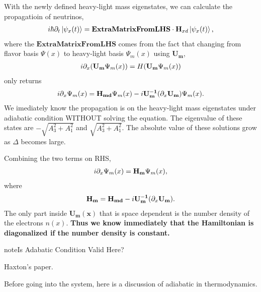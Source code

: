 \documentclass[letterpaper,12pt,english]{sphinxmanual}
\newcommand{\ket}[1]{\left| #1\right\rangle}
\begin{document}
With the newly defined heavy-light mass eigenstates, we can calculate the propagatioin of neutrinos,
\begin{gather}
\begin{split}i \hbar \partial_t \ket{\psi_x(t)} = \mathbf{Extra Matrix From LHS}\cdot \mathbf H_{xd} \ket{\psi_x(t)},\end{split}\notag
\end{gather}
where the \(\mathbf{Extra Matrix From LHS}\) comes from the fact that changing from flavor basis \(\Psi(x)\) to heavy-light basis \(\Psi_m(x)\) using \(\mathbf {U_m}\),
\begin{gather}
\begin{split}i\partial_x (\mathbf{U_m} \Psi_m(x)) = H ( \mathbf{U_m} \Psi_m(x) )\end{split}\notag
\end{gather}
only returns
\begin{gather}
\begin{split}i\partial_x \Psi_m(x) = \mathbf{H_{md} } \Psi_m(x) - i \mathbf{U_m^{-1}} ( \partial_x \mathbf{U_m} ) \Psi_m(x).\end{split}\notag
\end{gather}
We imediately know the propagation is on the heavy-light mass eigenstates under adiabatic condition WITHOUT solving the equation. The eigenvalue of these states are \(-\sqrt{A_3^2+A_1^2}\) and \(\sqrt{A_3^2+A_1^2}\). The absolute value of these solutions grow as \(\Delta\) becomes large.

Combining the two terms on RHS,
\begin{gather}
\begin{split}i\partial_x \Psi_m(x) = \mathbf{H_m} \Psi_m(x),\end{split}\notag
\end{gather}
where
\begin{gather}
\begin{split}\mathbf{H_m} = \mathbf{H_{md}} - i \mathbf{U_m^{-1}} ( \partial_x \mathbf{ U_m } ).\end{split}\notag
\end{gather}
The only part inside \(\mathbf{U_m(x)}\) that is space dependent is the number density of the electrons \(n(x)\). \textbf{Thus we know immediately that the Hamiltonian is diagonalized if the number density is constant.}

\begin{notice}{note}{Is Adabatic Condition Valid Here?}

Haxton's paper.

Before going into the system, here is a discussion of adiabatic in thermodynamics.
\end{notice}
\end{document}
